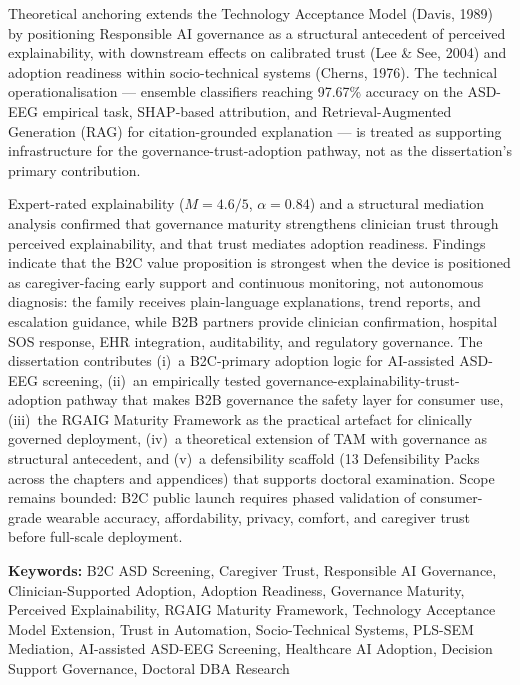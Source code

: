 \documentclass[12pt,a4paper,oneside]{report}
\begin{document}
Theoretical anchoring extends the Technology Acceptance Model (Davis, 1989) by positioning Responsible AI governance as a structural antecedent of perceived explainability, with downstream effects on calibrated trust (Lee \& See, 2004) and adoption readiness within socio-technical systems (Cherns, 1976). The technical operationalisation --- ensemble classifiers reaching 97.67\% accuracy on the ASD-EEG empirical task, SHAP-based attribution, and Retrieval-Augmented Generation (RAG) for citation-grounded explanation --- is treated as supporting infrastructure for the governance-trust-adoption pathway, not as the dissertation's primary contribution.

Expert-rated explainability ($M = 4.6/5$, $\alpha = 0.84$) and a structural mediation analysis confirmed that governance maturity strengthens clinician trust through perceived explainability, and that trust mediates adoption readiness. Findings indicate that the B2C value proposition is strongest when the device is positioned as caregiver-facing early support and continuous monitoring, not autonomous diagnosis: the family receives plain-language explanations, trend reports, and escalation guidance, while B2B partners provide clinician confirmation, hospital SOS response, EHR integration, auditability, and regulatory governance. The dissertation contributes (i)~a B2C-primary adoption logic for AI-assisted ASD-EEG screening, (ii)~an empirically tested governance-explainability-trust-adoption pathway that makes B2B governance the safety layer for consumer use, (iii)~the RGAIG Maturity Framework as the practical artefact for clinically governed deployment, (iv)~a theoretical extension of TAM with governance as structural antecedent, and (v)~a defensibility scaffold (13 Defensibility Packs across the chapters and appendices) that supports doctoral examination. Scope remains bounded: B2C public launch requires phased validation of consumer-grade wearable accuracy, affordability, privacy, comfort, and caregiver trust before full-scale deployment.

\vspace{1cm}

\noindent\textbf{Keywords:} B2C ASD Screening, Caregiver Trust, Responsible AI Governance, Clinician-Supported Adoption, Adoption Readiness, Governance Maturity, Perceived Explainability, RGAIG Maturity Framework, Technology Acceptance Model Extension, Trust in Automation, Socio-Technical Systems, PLS-SEM Mediation, AI-assisted ASD-EEG Screening, Healthcare AI Adoption, Decision Support Governance, Doctoral DBA Research
\end{document}
